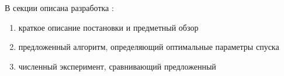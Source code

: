В секции описана разработка 
: \begin{enumerate}
    \item краткое описание постановки и предметный обзор
    \item предложенный алгоритм, определяющий оптимальные параметры спуска  
    \item численный эксперимент, сравнивающий предложенный 
\end{enumerate} 
